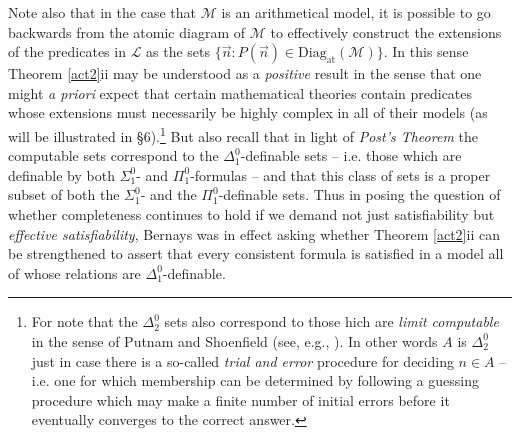 \documentclass[11pt,fleqn,leqno]{article}
\begin{document}
Note also that in the case that $\mathcal{M}$ is an arithmetical model, it is possible to go backwards from  the atomic diagram of $\mathcal{M}$ to effectively construct the extensions of the predicates in $\mathcal{L}$ as the sets $\{\vec{n} : P(\vec{n}) \in  \mathrm{Diag}_{\mathrm{at}}(\mathcal{M})\}$.   In this sense Theorem \ref{act2}ii may be understood as a \textsl{positive} result in the sense that one might \textsl{a priori} expect that certain mathematical theories contain predicates whose extensions must necessarily be highly complex in all of their models (as will be illustrated in \S 6).\footnote{For note that the $\Delta^0_2$ sets also correspond to those hich are \textsl{limit computable} in the sense of Putnam and Shoenfield (see, e.g., \citealp[\S 3.5]{Soare2016}).   In other words $A$ is $\Delta^0_2$ just in case there is a so-called \textsl{trial and error} procedure for deciding $n \in A$ -- i.e. one for which membership can be determined by following a guessing procedure which may make a finite number of initial errors before it eventually converges to the correct answer.}    But also recall that in light of \textsl{Post's Theorem}   the computable sets correspond to the $\Delta^0_1$-definable sets -- i.e. those which are definable by both $\Sigma^0_1$- and $\Pi^0_1$-formulas -- and that this class of sets is a proper subset of both the $\Sigma^0_1$- and the $\Pi^0_1$-definable sets. Thus in posing the question of whether completeness continues to hold if we demand not just satisfiability but \textsl{effective satisfiability}, Bernays was in effect asking whether Theorem \ref{act2}ii can be strengthened to assert that every consistent formula is satisfied in a model all of whose relations are $\Delta^0_1$-definable.    
\end{document}

